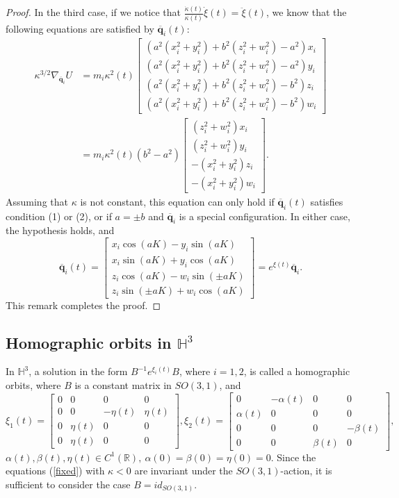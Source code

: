 \documentclass[12pt]{amsart}
\theoremstyle{definition}
\def \mb{\mathbb}
\def \R{\mb R}                 %
\def \H{\mb H}        %
\newcommand {\q} {\mathbf{q}}
\begin{document}
{\begin{proof}
In the third case, if we notice that $\frac{\dot{\kappa}(t)}{\kappa(t)}\dot{\xi}(t)=\ddot{\xi}(t)$, we know that the following equations are satisfied by $\overline{\q}_i(t)$:
\begin{align*}
\kappa^{3/2}\nabla_{\overline{\q}_i} U&=m_i\kappa^2(t)\begin{bmatrix}(a^2(x_i^2+y_i^2)+b^2(z_i^2+w_i^2)-a^2)x_i\\ (a^2(x_i^2+y_i^2)+b^2(z_i^2+w_i^2)-a^2)y_i\\ (a^2(x_i^2+y_i^2)+b^2(z_i^2+w_i^2)-b^2)z_i\\ (a^2(x_i^2+y_i^2)+b^2(z_i^2+w_i^2)-b^2)w_i\end{bmatrix}\\
&= m_i\kappa^2(t)(b^2-a^2)\begin{bmatrix}(z_i^2+w_i^2)x_i\\ (z_i^2+w_i^2)y_i\\ -(x_i^2+y_i^2)z_i\\ -(x_i^2+y_i^2)w_i\end{bmatrix}.\end{align*}
Assuming that $\kappa$ is not constant, this equation can only hold if $\overline{\q}_i(t)$ satisfies condition (1) or (2), or if $a=\pm b$ and $\overline{\q}_i$ is a special configuration. In either case, the hypothesis holds, and \begin{equation*}
\overline{\q}_i(t)=\begin{bmatrix}x_i\cos(aK)-y_i\sin(aK)\\ x_i\sin(aK)+y_i\cos(aK)\\ z_i\cos(aK)-w_i\sin(\pm aK)\\ z_i\sin(\pm aK)+w_i\cos(aK)\end{bmatrix}=e^{\xi(t)}\overline{\q}_i.\end{equation*}
This remark completes the proof.
\end{proof}
 
\subsection{Homographic orbits in $\H^3$}
In $\H^3$, a solution in the form  $B^{-1}e^{\xi_i(t)}B$,  where $i=1,2$, is called a homographic orbits, where $B$ is a constant matrix in  $SO(3,1)$, and 
$$\xi_1(t)=\begin{bmatrix}0 & 0 & 0 & 0\\ 0 & 0 & -\eta(t) & \eta(t)\\ 0 & \eta(t) & 0 & 0 \\ 0 & \eta(t) & 0 & 0\end{bmatrix}, \xi_2(t)=\begin{bmatrix}0 & -\alpha(t) & 0 & 0\\ \alpha(t) & 0 & 0 & 0\\ 0 & 0 & 0 & -\beta(t)\\ 0 & 0 & \beta(t) & 0\end{bmatrix},$$
$\alpha(t), \beta(t), \eta(t) \in C^1(\R),\ \alpha(0)= \beta(0)=\eta(0)=0.$ 
Since the equations (\ref{fixed}) with $\kappa<0$ are invariant under the $SO(3,1)$-action, it is sufficient to consider the case $B=id_{SO(3,1)}$. 


}
\end{document}
